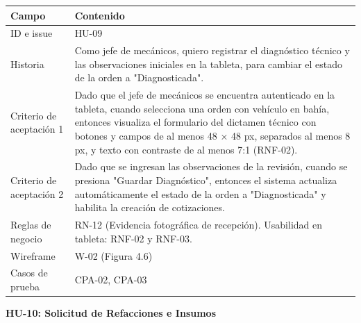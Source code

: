{\def\LTcaptype{none} %
\begin{longtable}[]{@{}
  >{\raggedright\arraybackslash}p{}
  >{\raggedright\arraybackslash}p{}@{}}
\toprule\noalign{}
\begin{minipage}[b]{\linewidth}\raggedright
\textbf{Campo}
\end{minipage} & \begin{minipage}[b]{\linewidth}\raggedright
\textbf{Contenido}
\end{minipage} \\
\midrule\noalign{}
\endhead
\bottomrule\noalign{}
\endlastfoot
ID e issue & HU-09 \\
Historia & Como jefe de mecánicos, quiero registrar el diagnóstico
técnico y las observaciones iniciales en la tableta, para cambiar el
estado de la orden a "Diagnosticada". \\
Criterio de aceptación 1 & Dado que el jefe de mecánicos se encuentra
autenticado en la tableta, cuando selecciona una orden con vehículo en
bahía, entonces visualiza el formulario del dictamen técnico con
botones y campos de al menos 48 × 48 px, separados al menos 8 px, y
texto con contraste de al menos 7:1 (RNF-02). \\
Criterio de aceptación 2 & Dado que se ingresan las observaciones de la
revisión, cuando se presiona "Guardar Diagnóstico", entonces el sistema
actualiza automáticamente el estado de la orden a "Diagnosticada" y
habilita la creación de cotizaciones. \\
Reglas de negocio & RN-12 (Evidencia fotográfica de recepción).
Usabilidad en tableta: RNF-02 y RNF-03. \\
Wireframe & W-02 (Figura 4.6) \\
Casos de prueba & CPA-02, CPA-03 \\
\end{longtable}
}

\textbf{HU-10: Solicitud de Refacciones e Insumos}

